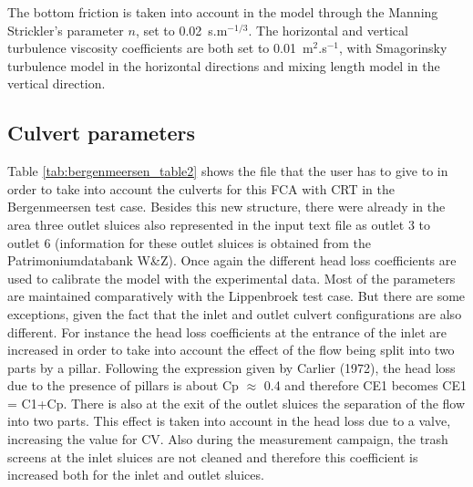 The bottom friction is taken into account in the model through the Manning
Strickler’s parameter $n$, set to 0.02~s.m$^{-1/3}$.
The horizontal and vertical turbulence viscosity coefficients are both set to
0.01~m$^2$.s$^{-1}$,
with Smagorinsky turbulence model in the horizontal directions and mixing length
model in the vertical direction.

\subsection{Culvert parameters}
Table \ref{tab:bergenmeersen_table2} shows the file that the user has to give to
 in order to take
into account the culverts for this FCA with CRT in the Bergenmeersen test case.
Besides this new structure, there were already in the area three outlet sluices
also represented in the input text file as outlet 3 to outlet 6
(information for these outlet sluices is obtained from the Patrimoniumdatabank W\&Z).
Once again the different head loss coefficients are used to calibrate the model
with the experimental data.
Most of the parameters are maintained comparatively with the Lippenbroek test case.
But there are some exceptions, given the fact that the inlet and outlet culvert
configurations are also different.
For instance the head loss coefficients at the entrance of the inlet are
increased in order to take
into account the effect of the flow being split into two parts by a pillar.
Following the expression given by Carlier (1972), the head loss due to the
presence of pillars is about Cp $\approx$ 0.4
and therefore CE1 becomes CE1 = C1+Cp.
There is also at the exit of the outlet sluices the separation of the flow into
two parts.
This effect is taken into account in the head loss due to a valve, increasing
the value for CV.
Also during the measurement campaign, the trash screens at the inlet sluices are
not cleaned and therefore this coefficient is increased both for the inlet and
outlet sluices.

